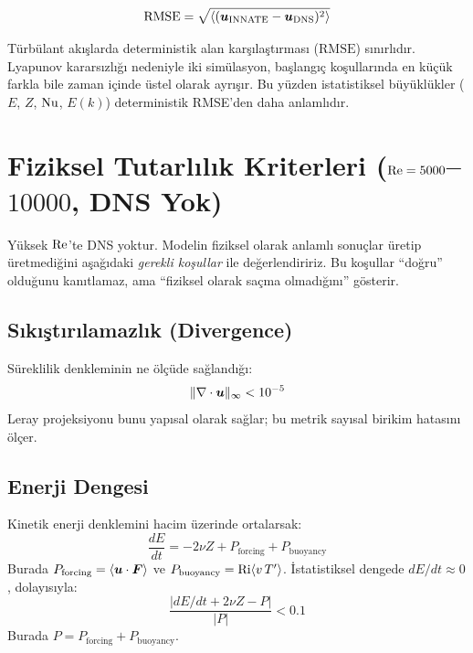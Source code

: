 \begin{equation}
    \text{RMSE} = \sqrt{ \langle (\bm{u}_{\text{INNATE}} - \bm{u}_{\text{DNS}})^2 \rangle }
    \label{eq:rmse}
\end{equation}

\begin{remark}
Türbülant akışlarda deterministik alan karşılaştırması ($\text{RMSE}$) sınırlıdır. Lyapunov kararsızlığı nedeniyle iki simülasyon, başlangıç koşullarında en küçük farkla bile zaman içinde üstel olarak ayrışır. Bu yüzden istatistiksel büyüklükler ($E$, $Z$, $\mathrm{Nu}$, $E(k)$) deterministik RMSE'den daha anlamlıdır.
\end{remark}


\section{Fiziksel Tutarlılık Kriterleri ($\mathrm{Re} = 5000$--$10000$, DNS Yok)}
\label{sec:consistency}

Yüksek $\mathrm{Re}$'te DNS yoktur. Modelin fiziksel olarak anlamlı sonuçlar üretip üretmediğini aşağıdaki \textit{gerekli koşullar} ile değerlendiririz. Bu koşullar ``doğru'' olduğunu kanıtlamaz, ama ``fiziksel olarak saçma olmadığını'' gösterir.

\subsection{Sıkıştırılamazlık (Divergence)}

Süreklilik denkleminin ne ölçüde sağlandığı:
\begin{equation}
    \| \nabla \cdot \bm{u} \|_\infty < 10^{-5}
    \label{eq:div_criterion}
\end{equation}
Leray projeksiyonu bunu yapısal olarak sağlar; bu metrik sayısal birikim hatasını ölçer.

\subsection{Enerji Dengesi}

Kinetik enerji denklemini hacim üzerinde ortalarsak:
\begin{equation}
    \frac{dE}{dt} = -2\nu Z + P_{\text{forcing}} + P_{\text{buoyancy}}
    \label{eq:energy_balance}
\end{equation}
Burada $P_{\text{forcing}} = \langle \bm{u} \cdot \bm{F} \rangle$ ve $P_{\text{buoyancy}} = \mathrm{Ri} \langle v\,T' \rangle$. İstatistiksel dengede $dE/dt \approx 0$, dolayısıyla:
\begin{equation}
    \frac{|dE/dt + 2\nu Z - P|}{|P|} < 0.1
    \label{eq:balance_criterion}
\end{equation}
Burada $P = P_{\text{forcing}} + P_{\text{buoyancy}}$.

